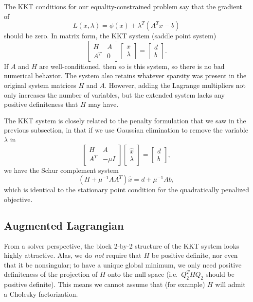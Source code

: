 \documentclass[12pt, leqno]{article} %
\begin{document}
The KKT conditions for our equality-constrained problem say that the
gradient of
\[
  L(x,\lambda) = \phi(x) + \lambda^T (A^T x-b)
\]
should be zero.  In matrix form, the KKT system (saddle point system)
\[
  \begin{bmatrix}
    H & A \\
    A^T & 0
  \end{bmatrix}
  \begin{bmatrix} x \\ \lambda \end{bmatrix} =
  \begin{bmatrix} d \\ b \end{bmatrix}.
\]
If $A$ and $H$ are well-conditioned, then so is this system,
so there is no bad numerical behavior.  The system also retains
whatever sparsity was present in the original system matrices
$H$ and $A$.  However, adding the Lagrange multipliers not only
increases the number of variables, but the extended system lacks
any positive definiteness that $H$ may have.

The KKT system is closely related to the penalty formulation that
we saw in the previous subsection, in that if we use Gaussian
elimination to remove the variable $\lambda$ in
\[
  \begin{bmatrix}
    H & A \\
    A^T & -\mu I
  \end{bmatrix}
  \begin{bmatrix} \hat{x} \\ \lambda \end{bmatrix} =
  \begin{bmatrix} d \\ b \end{bmatrix},
\]
we have the Schur complement system
\[
  (H+\mu^{-1} AA^T) \hat{x} = d + \mu^{-1} A b,
\]
which is identical to the stationary point condition for the
quadratically penalized objective.

\subsection{Augmented Lagrangian}

From a solver perspective, the block 2-by-2 structure of the KKT
system looks highly attractive.  Alas, we do {\em not} require that
$H$ be positive definite, nor even that it be nonsingular; to have a
unique global minimum, we only need positive definiteness of the
projection of $H$ onto the null space (i.e.~$Q_2^T H Q_2$ should be
positive definite).  This means we cannot assume that (for example)
$H$ will admit a Cholesky factorization.
\end{document}
